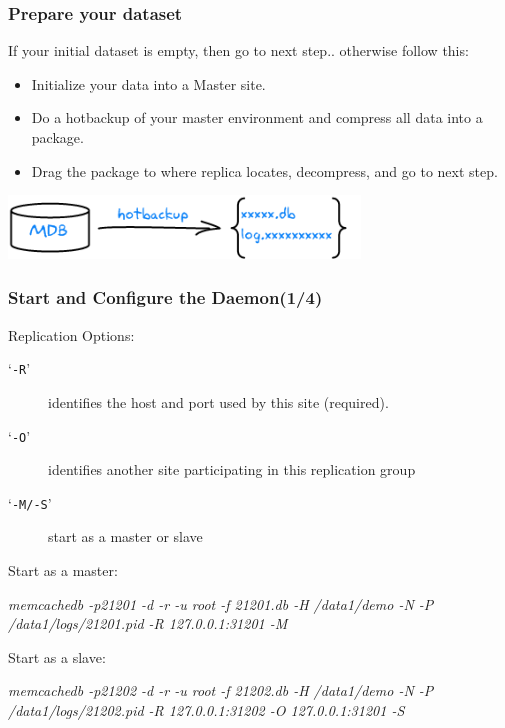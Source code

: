 \documentclass{beamer}
\newcommand{\command}[1]{`\texttt{#1}'}
\begin{document}
\begin{frame}
\frametitle{Prepare your dataset}
If your initial dataset is empty, then go to next step.. otherwise follow this:
\begin{itemize}
\item Initialize your data into a Master site.
\item Do a hotbackup of your master environment and compress all data into a package.
\item Drag the package to where replica locates, decompress, and go to next step.
\end{itemize}
\begin{center}
\includegraphics[scale=1,width=0.70\textwidth]{hotbackup.png}
\end{center}
\end{frame}
\begin{frame}
\frametitle{Start and Configure the Daemon(1/4)}
Replication Options:
\begin{description}
\item[\command{-R}]
  identifies the host and port used by this site (required).
\item[\command{-O}]
  identifies another site participating in this replication group
\item[\command{-M/-S}]
  start as a master or slave
\end{description}
Start as a master:
\begin{block}{}
\begin{semiverbatim}
 \textit{memcachedb -p21201 -d -r -u root -f 21201.db -H /data1/demo -N -P /data1/logs/21201.pid -R 127.0.0.1:31201 -M}
\end{semiverbatim}
\end{block}
Start as a slave:
\begin{block}{}
\begin{semiverbatim}
 \textit{memcachedb -p21202 -d -r -u root -f 21202.db -H /data1/demo -N -P /data1/logs/21202.pid -R 127.0.0.1:31202 -O 127.0.0.1:31201 -S}
\end{semiverbatim}
\end{block}
\end{frame}
\end{document}
